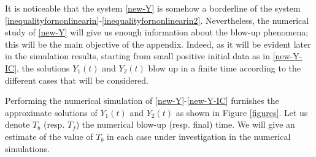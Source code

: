 \documentclass[12pt,leqno]{amsart}
\numberwithin{equation}{section}
\theoremstyle{remark}
\begin{document}
It is noticeable that the  system \eqref{new-Y} is somehow a borderline of the system  \eqref{inequalityfornonlinearin}-\eqref{inequalityfornonlinearin2}. Nevertheless, the numerical study of  \eqref{new-Y}  will give us enough information about the blow-up phenomena;  this will be the main objective of the appendix. Indeed, as it will be evident later  in the simulation results, starting from small positive initial data as in \eqref{new-Y-IC}, the solutions $Y_1(t)$ and $Y_2(t)$ blow up in a finite time according to the different cases that will be considered.





Performing the numerical simulation of \eqref{new-Y}-\eqref{new-Y-IC} furnishes the approximate solutions of  $Y_1(t)$ and $Y_2(t)$  as shown in Figure \ref{figures}. Let us denote $T_b$ (resp. $T_f$) the numerical blow-up (resp. final) time. We will give an estimate of the value of $T_b$ in each case under investigation in the numerical simulations.


  
\end{document}
